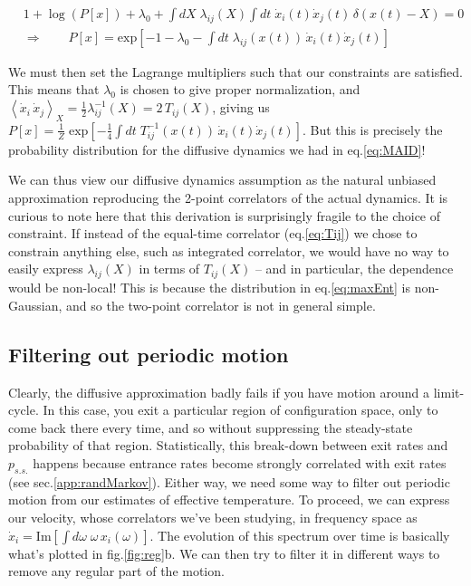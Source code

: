 \documentclass[reprint,prx]{revtex4-1}
\renewcommand{\=}[1]{\stackrel{#1}{=}} %
\renewcommand{\(}{\left (}
\renewcommand{\)}{\right  )}
\renewcommand{\[}{\left [}
\renewcommand{\]}{\right ]}
\newcommand{\<}{\left <}
\renewcommand{\>}{\right >}
\theoremstyle{definition}
\theoremstyle{remark}
\renewcommand{\exp}[1]{\mbox{exp}\[#1\]} %
\renewcommand{\Im}{\mbox{Im}}  %
\begin{document}
\begin{widetext}
	\begin{align}
	&1+ \log(P[x])+\lambda_0 + \int dX \; \lambda_{ij}(X) \int dt \; \dot{x}_i(t) \dot{x}_j(t) \,\delta(x(t) - X) =0\\
	&\Rightarrow \qquad P[x]=\exp{-1-\lambda_{0}-\int dt \; \lambda_{ij}(x(t))\,\dot{x}_i(t) \dot{x}_j(t) } \label{eq:maxEnt}
	\end{align} 
\end{widetext}
We must then set the Lagrange multipliers such that our constraints are satisfied. This means that $ \lambda_0 $ is chosen to give proper normalization, and $ \< \dot{x}_i\, \dot{x}_j\>_X = \frac{1}{2}\lambda^{-1}_{ij}(X) = 2 \,T_{ij}(X)$, giving us $ P[x]=\frac{1}{Z}\; \exp{-\frac{1}{4}\int dt \; T^{-1}_{ij}(x(t)) \,\dot{x}_i(t) \dot{x}_j(t)}  $. But this is precisely the probability distribution for the diffusive dynamics we had in eq.\ref{eq:MAID}! 

We can thus view our diffusive dynamics assumption as the natural unbiased approximation reproducing the 2-point correlators of the actual dynamics. It is curious to note here that this derivation is surprisingly fragile to the choice of constraint. If instead of the equal-time correlator (eq.\ref{eq:Tij}) we chose to constrain anything else, such as integrated correlator, we would have no way to easily express $ \lambda_{ij}(X) $ in terms of $ T_{ij}(X) $ -- and in particular, the dependence would be non-local! This is because the distribution in eq.\ref{eq:maxEnt} is non-Gaussian, and so the two-point correlator is not in general simple. 

\subsection{Filtering out periodic motion}
Clearly, the diffusive approximation badly fails if you have motion around a limit-cycle. In this case, you exit a particular region of configuration space, only to come back there every time, and so without suppressing the steady-state probability of that region. Statistically, this break-down between exit rates and $ p_{s.s.} $ happens because entrance rates become strongly correlated with exit rates (see sec.\ref{app:randMarkov}). Either way, we need some way to filter out periodic motion from our estimates of effective temperature. To proceed, we can express our velocity, whose correlators we've been studying, in frequency space as $ \dot{x}_i = \Im\[\int d\omega \; \omega\, x_i(\omega)\] $. The evolution of this spectrum over time is basically what's plotted in fig.\ref{fig:reg}b. We can then try to filter it in different ways to remove any regular part of the motion. 
\end{document}
